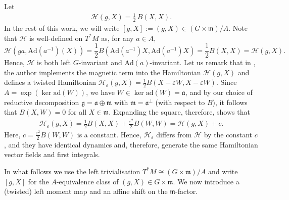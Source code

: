 \documentclass[11pt]{amsart}
\theoremstyle{definition}
\theoremstyle{plain}
\theoremstyle{conclusion}
\begin{document}
Let \begin{align}
    \mathcal{H}(g,X)=\frac{1}{2}\,B(X,X)    . \label{eq:hamiltonianquad}
\end{align}    In the rest of this work, we will write $[g,X] := (g,X)\in (G\times\mathfrak{m})/A$. Note that $\mathcal{H}$ is well-defined on $T^*M$ as, for any $a \in A$, $$ \mathcal{H}(ga, \mathrm{Ad}(a^{-1})(X)) = \frac{1}{2} B(\mathrm{Ad}(a^{-1})X,\mathrm{Ad}(a^{-1})X ) = \frac{1}{2} B(X,X) = \mathcal{H}(g,X).$$ Hence, $\mathcal{H}$ is both left $G$-invariant and $\mathrm{Ad}(a)$-invariant. Let us remark that in \cite{MR2141306}, the author implements the magnetic term into the Hamiltonian $\mathcal{H}(g,X)$ and defines a twisted Hamiltonian $\mathcal{H}_\varepsilon (g,X) = \frac{1}{2} B(X - \varepsilon W, X - \varepsilon W)$. Since $A = \exp(\ker\mathrm{ad}(W))$, we have $W\in \ker\mathrm{ad}(W)=\mathfrak{a}$, and by our choice of reductive decomposition $\mathfrak{g}=\mathfrak{a}\oplus \mathfrak{m}$ with $\mathfrak{m}=\mathfrak{a}^\perp$ (with respect to $B$), it follows that $B(X,W) = 0$ for all $X\in\mathfrak{m}$. Expanding the square, therefore, shows that \begin{align*}
    \mathcal{H}_\varepsilon (g,X) = \frac{1}{2} B(X,X) + \frac{\varepsilon^2}{2} B(W,W) = \mathcal{H}(g,X) + c.
\end{align*} Here, $c =  \frac{\varepsilon^2}{2} B(W,W)$ is a constant. Hence, $\mathcal{H}_\varepsilon$ differs from $\mathcal{H}$ by the constant $c$, and they have identical dynamics and, therefore, generate the same Hamiltonian vector fields and first integrals.

In what follows we use the left trivialisation $T^*M\cong (G\times\mathfrak{m})/A$ and write $[g,X]$ for the $A$-equivalence class of $(g,X)\in G\times\mathfrak{m}$. We now introduce a (twisted) left moment map and an affine shift on the $\mathfrak{m}$-factor. %
\end{document}
